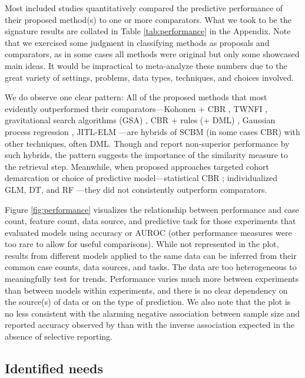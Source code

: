 \documentclass[sn-mathphys,Numbered,pdflatex]{sn-jnl}
\theoremstyle{remark}
\theoremstyle{definition}
\newcommand{\hl}[1]{#1}
\begin{document}
Most included studies quantitatively compared the predictive performance
of their proposed method(s) to one or more comparators. What we took to
be the signature results are collated in Table \ref{tab:performance} in
the Appendix. Note that we exercised some judgment in classifying
methods as proposals and comparators, as in some cases all methods were
original but only some showcased main ideas. It would be impractical to
meta-analyze these numbers due to the great variety of settings,
problems, data types, techniques, and choices involved.

We do observe one clear pattern: All of the proposed methods that most
evidently outperformed their comparators---Kohonen + CBR
\citep{Wyns2004}, TWNFI \citep{Song2006, Kasabov2010}, gravitational
search algorithms (GSA) \citep{Liang2015}, CBR + rules (+ DML)
\citep{Nicolas2014}, Gaussian process regression \citep{Zhang2018},
JITL-ELM \citep{Ma2020}---are hybrids of \hl{SCBM} (in some cases CBR)
with other techniques, often DML. Though \citet{CampilloGimenez2013} and
\citet{Ng2015} report non-superior performance by such hybrids, the
pattern suggests the importance of the similarity measure to the
retrieval step. Meanwhile, when proposed approaches targeted cohort
demarcation or choice of predictive model---statistical CBR
\citep{Park2006}; individualized \hl{GLM, DT, and RF}
\citep{Lee2015, Lee2017}---they did not consistently outperform
comparators.

\hl{Figure }\ref{fig:performance}\hl{ visualizes the relationship between performance and case count, feature count, data source, and predictive task for those experiments that evaluated models using accuracy or AUROC (other performance measures were too rare to allow for useful comparisons).
While not represented in the plot, results from different models applied to the same data can be inferred from their common case counts, data sources, and tasks.
The data are too heterogeneous to meaningfully test for trends. Performance varies much more between experiments than between models within experiments, and there is no clear dependency on the source(s) of data or on the type of prediction.
We also note that the plot is no less consistent with the alarming negative association between sample size and reported accuracy observed by }\citet{Berisha2021}\hl{ than with the inverse association expected in the absence of selective reporting.}

\subsection{Identified needs}\label{identified-needs}
\end{document}
